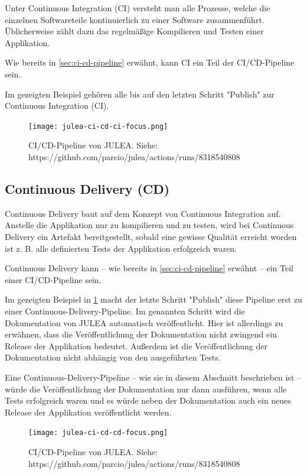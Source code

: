 Unter Continuous Integration (CI) versteht man alle Prozesse, welche die einzelnen Softwareteile kontinuierlich zu einer Software zusammenführt. Üblicherweise zählt dazu das regelmäßige Kompilieren und Testen einer Applikation.

Wie bereits in \cref{sec:ci-cd-pipeline} erwähnt, kann CI ein Teil der CI/CD-Pipeline sein.

Im gezeigten Beispiel gehören alle bis auf den letzten Schritt "Publish" zur Continuous Integration (CI).

\begin{figure}[H]
    \texttt{[image: julea-ci-cd-ci-focus.png]}
    \caption{CI/CD-Pipeline von JULEA. \newline
        Siehe: https://github.com/parcio/julea/actions/runs/8318540808}
\end{figure}

\pagebreak

\subsection{Continuous Delivery (CD)}

Continuous Delivery baut auf dem Konzept von Continuous Integration auf. Anstelle die Applikation nur zu kompilieren und zu testen, wird bei Continuous Delivery ein Artefakt bereitgestellt, sobald eine gewisse Qualität erreicht worden ist z. B. alle definierten Tests der Applikation erfolgreich waren. 

Continuous Delivery kann – wie bereits in \cref{sec:ci-cd-pipeline} erwähnt – ein Teil einer CI/CD-Pipeline sein. 

Im gezeigten Beispiel in \cref{fig:julea-ci-cd-cd-focus} macht der letzte Schritt "Publish" diese Pipeline erst zu einer Continuous-Delivery-Pipeline. Im genannten Schritt wird die Dokumentation von JULEA automatisch veröffentlicht. Hier ist allerdings zu erwähnen, dass die Veröffentlichung der Dokumentation nicht zwingend ein Release der Applikation bedeutet. Außerdem ist die Veröffentlichung der Dokumentation nicht abhängig von den ausgeführten Tests. 

Eine Continuous-Delivery-Pipeline – wie sie in diesem Abschnitt beschrieben ist – würde die Veröffentlichung der Dokumentation nur dann ausführen, wenn alle Tests erfolgreich waren und es würde neben der Dokumentation auch ein neues Release der Applikation veröffentlicht werden.

\begin{figure}[H]
    \texttt{[image: julea-ci-cd-cd-focus.png]}
    \caption{CI/CD-Pipeline von JULEA. \newline
        Siehe: https://github.com/parcio/julea/actions/runs/8318540808}
    \label{fig:julea-ci-cd-cd-focus}
\end{figure}

